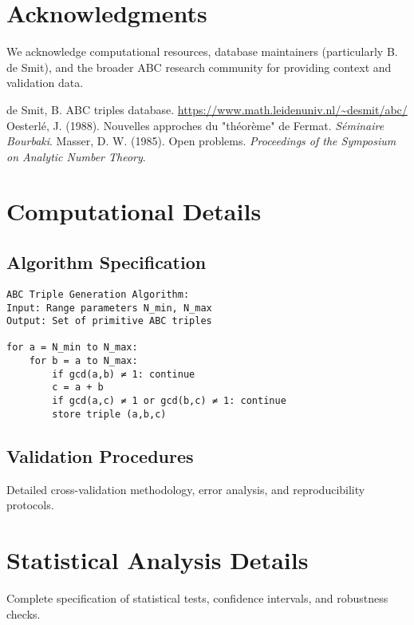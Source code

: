 \documentclass[11pt,a4paper]{article}
\begin{document}
\section*{Acknowledgments}
We acknowledge computational resources, database maintainers (particularly B. de Smit), and the broader ABC research community for providing context and validation data.

\begin{thebibliography}{20}
 de Smit, B. ABC triples database. \url{https://www.math.leidenuniv.nl/~desmit/abc/}
 Oesterlé, J. (1988). Nouvelles approches du "théorème" de Fermat. \textit{Séminaire Bourbaki}.
 Masser, D. W. (1985). Open problems. \textit{Proceedings of the Symposium on Analytic Number Theory}.
\end{thebibliography}

\appendix

\section{Computational Details}

\subsection{Algorithm Specification}
\begin{verbatim}
ABC Triple Generation Algorithm:
Input: Range parameters N_min, N_max
Output: Set of primitive ABC triples

for a = N_min to N_max:
    for b = a to N_max:
        if gcd(a,b) ≠ 1: continue
        c = a + b
        if gcd(a,c) ≠ 1 or gcd(b,c) ≠ 1: continue
        store triple (a,b,c)
\end{verbatim}

\subsection{Validation Procedures}
Detailed cross-validation methodology, error analysis, and reproducibility protocols.

\section{Statistical Analysis Details}
Complete specification of statistical tests, confidence intervals, and robustness checks.
\end{document}
